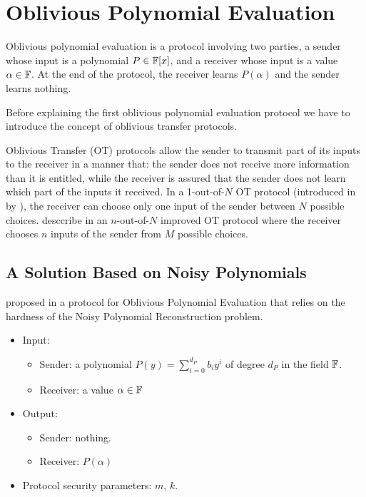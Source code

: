 \section{Oblivious Polynomial Evaluation}
\label{sec:ope}
Oblivious polynomial evaluation is a protocol involving two parties, a sender whose input is a polynomial $P \in {\mathbb F}[x]$, and a receiver whose input is a value $\alpha \in {\mathbb F}$. At the end of the protocol, the receiver learns $P(\alpha)$ and the sender learns nothing.

Before explaining the first oblivious polynomial evaluation protocol we have to introduce the concept of oblivious transfer protocols.

Oblivious Transfer (OT) protocols allow the sender to transmit part of its inputs to the receiver in a manner that: the sender does not receive more information than it is entitled, while the receiver is assured that the sender does not learn which part of the inputs it received. In a 1-out-of-$N$ OT protocol (introduced in \cite{BrassardCR86} by \citeauthor{BrassardCR86}), the receiver can choose only one input of the sender between $N$ possible choices. \citeauthor{OT} desccribe in \cite{OT} an $n$-out-of-$N$ improved OT protocol where the receiver chooses $n$ inputs of the sender from $M$ possible choices.

\subsection{A Solution Based on Noisy Polynomials}

\citeauthor{OPE} proposed in \cite{OPE} a protocol for Oblivious Polynomial Evaluation that relies on the hardness of the Noisy Polynomial Reconstruction problem.

\begin{itemize}
    \item Input:
    
    \begin{itemize}
        \item Sender: a polynomial $P(y) = \sum_{i=0}^{d_P} b_i y^i$ of degree $d_P$ in the field ${\mathbb F}$.
        \item Receiver: a value $\alpha \in {\mathbb F}$
    \end{itemize}
    
    \item Output:
    
    \begin{itemize}
        \item Sender: nothing.
        \item Receiver: $P(\alpha)$
    \end{itemize}
    
    \item Protocol security parameters: $m$, $k$.
    
\end{itemize}

